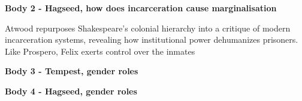 	\textbf{Body 2 - Hagseed, how does incarceration cause marginalisation}

	Atwood repurposes Shakespeare’s colonial hierarchy into a critique of modern incarceration systems, revealing how institutional power dehumanizes prisoners. Like Prospero, Felix exerts control over the inmates 

	\textbf{Body 3 - Tempest, gender roles}
	
	\textbf{Body 4 - Hagseed, gender roles}
